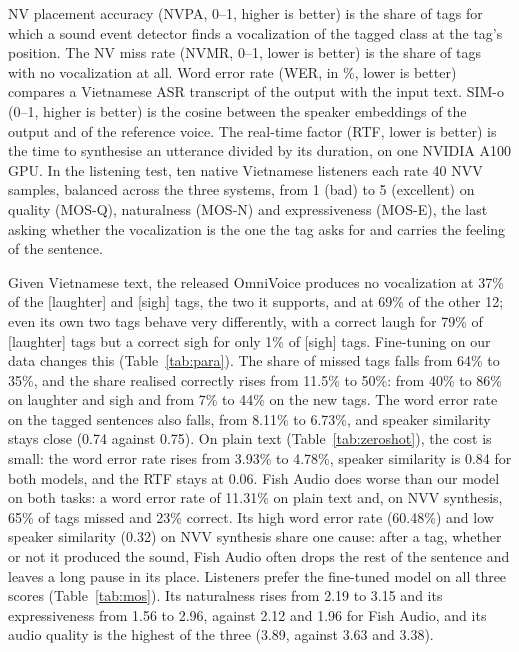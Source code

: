 \documentclass[a4paper]{article}
\makeatletter
\renewcommand{\normalsize}{\fontsize{13.5pt}{15.5pt}\selectfont}
\renewcommand{\section}{\@startsection{section}{1}{0pt}{7pt}{7pt}{\normalfont\normalsize\bfseries\centering}}
\makeatother
\begin{document}
NV placement accuracy (NVPA, 0--1, higher is better) is the share of tags for which a sound
event detector finds a vocalization of the tagged class at the tag's position. The NV miss rate
(NVMR, 0--1, lower is better) is the share of tags with no vocalization at all. Word error rate
(WER, in \%, lower is better) compares a Vietnamese ASR transcript of the output with the input
text. SIM-o (0--1, higher is better) is the cosine between the speaker embeddings of the output
and of the reference voice. The real-time factor (RTF, lower is better) is the time to
synthesise an utterance divided by its duration, on one NVIDIA A100 GPU. In the listening test,
ten native Vietnamese listeners each rate 40 NVV samples, balanced across the three systems,
from 1 (bad) to 5 (excellent) on quality
(MOS-Q), naturalness (MOS-N) and expressiveness (MOS-E), the last asking whether the
vocalization is the one the tag asks for and carries the feeling of the sentence.

\section{Results}\label{sec:results}
Given Vietnamese text, the released OmniVoice produces no vocalization at 37\% of the [laughter]
and [sigh] tags, the two it supports, and at 69\% of the other 12; even its own two tags behave
very differently, with a correct laugh for 79\% of [laughter] tags but a correct sigh for only
1\% of [sigh] tags. Fine-tuning on our data changes this (Table~\ref{tab:para}). The share of
missed tags falls from 64\% to 35\%, and the share realised correctly rises from 11.5\% to 50\%:
from 40\% to 86\% on laughter and sigh and from 7\% to 44\% on the new tags. The word error
rate on the tagged sentences also falls, from 8.11\% to 6.73\%, and speaker similarity stays
close (0.74 against 0.75). On plain text (Table~\ref{tab:zeroshot}), the cost is small: the word
error rate rises from 3.93\% to 4.78\%, speaker similarity is 0.84 for both models, and the RTF
stays at 0.06. Fish Audio does worse than our model on both tasks: a word error rate of
11.31\% on plain text and, on NVV synthesis, 65\% of tags missed and 23\% correct. Its high
word error rate (60.48\%) and low speaker similarity (0.32) on NVV synthesis share one cause:
after a tag, whether or not it produced the sound, Fish Audio often drops the rest of the
sentence and leaves a long pause in its place.
Listeners prefer the fine-tuned model on all three scores (Table~\ref{tab:mos}). Its
naturalness rises from 2.19 to 3.15 and its expressiveness from 1.56 to 2.96, against 2.12 and
1.96 for Fish Audio, and its audio quality is the highest of the three (3.89, against 3.63 and
3.38).
\end{document}
